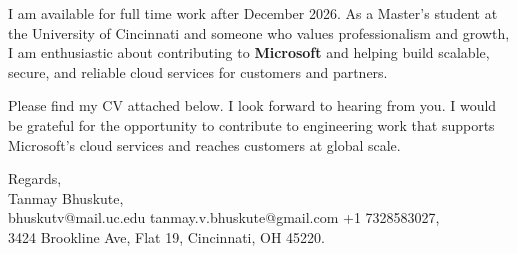 \documentclass[11pt]{letter}
\begin{document}
\begin{letter}{}
I am available for full time work after December 2026. As a Master's student at the University of Cincinnati and someone who values professionalism and growth, I am enthusiastic about contributing to \textbf{Microsoft} and helping build scalable, secure, and reliable cloud services for customers and partners.

Please find my CV attached below. I look forward to hearing from you. I would be grateful for the opportunity to contribute to engineering work that supports Microsoft's cloud services and reaches customers at global scale.

{\setlength{\parskip}{0pt}
Regards,\\
Tanmay Bhuskute,\\
bhuskutv@mail.uc.edu \textbar{} tanmay.v.bhuskute@gmail.com \textbar{} +1 7328583027,\\
3424 Brookline Ave, Flat 19, Cincinnati, OH 45220.
}

\end{letter}
\end{document}

